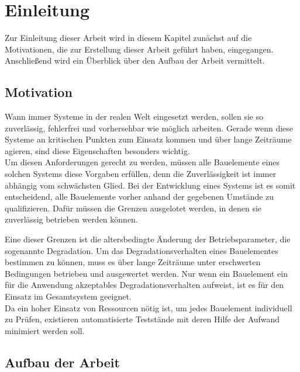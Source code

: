 
\chapter{Einleitung}
\label{chapter_einleitung}
Zur Einleitung dieser Arbeit wird in diesem Kapitel zunächst auf die Motivationen, die zur Erstellung dieser Arbeit geführt haben, eingegangen. Anschließend wird ein Überblick über den Aufbau der Arbeit vermittelt.

\section{Motivation}
Wann immer Systeme in der realen Welt eingesetzt werden, sollen sie so zuverlässig, fehlerfrei und vorhersehbar wie möglich arbeiten. Gerade wenn diese Systeme an kritischen Punkten zum Einsatz kommen und über lange Zeiträume agieren, sind diese Eigenschaften besonders wichtig.\\
Um diesen Anforderungen gerecht zu werden, müssen alle Bauelemente eines solchen Systems diese Vorgaben erfüllen, denn die Zuverlässigkeit ist immer abhängig vom schwächsten Glied.
Bei der Entwicklung eines Systems ist es somit entscheidend, alle Bauelemente vorher anhand der gegebenen Umstände zu qualifizieren. Dafür müssen die Grenzen ausgelotet werden, in denen sie zuverlässig betrieben werden können.

Eine dieser Grenzen ist die altersbedingte Änderung der Betriebsparameter, die sogenannte Degradation.
Um das Degradationsverhalten eines Bauelementes bestimmen zu können, muss es über lange Zeiträume unter erschwerten Bedingungen betrieben und ausgewertet werden. Nur wenn ein Bauelement ein für die Anwendung akzeptables Degradationsverhalten aufweist, ist es für den Einsatz im Gesamtsystem geeignet.\\
Da ein hoher Einsatz von Ressourcen nötig ist, um jedes Bauelement individuell zu Prüfen, existieren automatisierte Teststände mit deren Hilfe der Aufwand minimiert werden soll.
 
\section{Aufbau der Arbeit}

